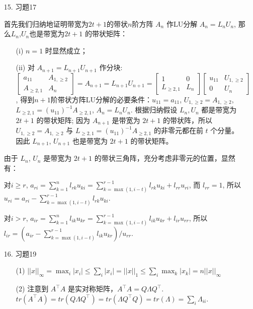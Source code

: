 \documentclass{article}
\begin{document}
\begin{itemize}
    \item [15.] 习题17
    \begin{spacing}{1.5}
    首先我们归纳地证明带宽为$2t+1$的带状$n$阶方阵 $A_n$ 作LU分解 $A_n=L_nU_n$, 那么$L_n$,$U_n$也是带宽为$2t+1$ 的带状矩阵：
    \begin{itemize}
        \item [(i)] $n=1$ 时显然成立；
        \item [(ii)] 对 $A_{n+1} = L_{n+1}U_{n+1}$ 作分块: $\left[\begin{array}{cc}a_{11} & A_{1,\geq2}\\A_{\geq2,1}&A_{n}\end{array}\right] = A_{n+1} = L_{n+1}U_{n+1} = \left[\begin{array}{cc}1&0\\L_{\geq2,1}&L_n\end{array}\right]\left[\begin{array}{cc}u_{11}&U_{1,\geq2}\\0&U_n\end{array}\right]$, 得到$n+1$阶带状方阵LU分解的必要条件：$u_{11} = a_{11}$, $U_{1,\geq 2} = A_{1,\geq 2}$, $L_{\geq 2, 1} = (u_{11})^{-1}A_{\geq 2,1}$, $A_n = L_nU_n$. 根据归纳假设 $L_n, U_n$ 都是带宽为 $2t+1$ 的带状矩阵; 因为 $A_{n+1}$ 是带宽为 $2t+1$ 的带状阵，所以 $U_{1,\geq2} = A_{1,\geq 2}$ 与 $L_{\geq 2, 1} = (u_{11})^{-1}A_{\geq 2,1}$ 的非零元都在前 $t$ 个分量。因此 $L_{n+1}$, $U_{n+1}$ 也是带宽为 $2t+1$ 的带状矩阵。
    \end{itemize}
    由于 $L_n$, $U_n$ 是带宽为 $2t+1$ 的带状三角阵，充分考虑非零元的位置，显然有：

    对$i\geq r$, $a_{ri} = \sum_{k=1}^{n} l_{rk}u_{ki} = \sum_{k=\max(1,i-t)}^{r-1} l_{rk}u_{ki} + l_{rr}u_{ri}$, 而 $l_{rr}=1$, 所以 $u_{ri} = a_{ri} - \sum_{k=\max(1,i-t)}^{r-1} l_{rk}u_{ki}$.

    对$i > r$, $a_{ir} = \sum_{k=1}^{n} l_{ik}u_{kr} = \sum_{k=\max(1, i-t)}^{r-1} l_{ik}u_{kr} + l_{ir}u_{rr}$, 所以 $l_{ir} = (a_{ir} - \sum_{k=\max(1, i-t)}^{r-1} l_{ik}u_{kr}) / u_{rr}$.
    \end{spacing}

    \item [16.] 习题19
    
    \begin{itemize}
        \item [(1)] $||x||_\infty = \max_{i} |x_i| \leq \sum_{i} |x_i| = ||x||_1 \leq \sum_{i} \max_{k} |x_k| = n ||x||_\infty$
        \item [(2)] 注意到 $A^\top A$ 是实对称矩阵，$A^\top A = Q\Lambda Q^\top$. $tr(A^\top A) = tr(Q\Lambda Q^\top) = tr(\Lambda Q^\top Q) = tr(\Lambda) = \sum_{i} \Lambda_{ii}$.
        

\end{itemize}
\end{itemize}
\end{document}
